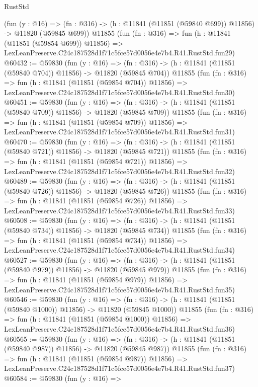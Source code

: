 \begin{lexlean}{RustStd}
\begin{coremodule}
    (fun (y : @16) =>
    (fn : @316) -> (h : @11841 (@11851 (@59840 @699)) @11856) -> @11820 (@59845 @699))
    @11855
    (fun (fn : @316) =>
    fun (h : @11841 (@11851 (@59854 @699)) @11856) =>
    LexLeanPreserve.C24c187528d1f71c5fce57d0056e4e7b4.R41.RustStd.fun29)
@60432 := @59830
    (fun (y : @16) =>
    (fn : @316) -> (h : @11841 (@11851 (@59840 @704)) @11856) -> @11820 (@59845 @704))
    @11855
    (fun (fn : @316) =>
    fun (h : @11841 (@11851 (@59854 @704)) @11856) =>
    LexLeanPreserve.C24c187528d1f71c5fce57d0056e4e7b4.R41.RustStd.fun30)
@60451 := @59830
    (fun (y : @16) =>
    (fn : @316) -> (h : @11841 (@11851 (@59840 @709)) @11856) -> @11820 (@59845 @709))
    @11855
    (fun (fn : @316) =>
    fun (h : @11841 (@11851 (@59854 @709)) @11856) =>
    LexLeanPreserve.C24c187528d1f71c5fce57d0056e4e7b4.R41.RustStd.fun31)
@60470 := @59830
    (fun (y : @16) =>
    (fn : @316) -> (h : @11841 (@11851 (@59840 @721)) @11856) -> @11820 (@59845 @721))
    @11855
    (fun (fn : @316) =>
    fun (h : @11841 (@11851 (@59854 @721)) @11856) =>
    LexLeanPreserve.C24c187528d1f71c5fce57d0056e4e7b4.R41.RustStd.fun32)
@60489 := @59830
    (fun (y : @16) =>
    (fn : @316) -> (h : @11841 (@11851 (@59840 @726)) @11856) -> @11820 (@59845 @726))
    @11855
    (fun (fn : @316) =>
    fun (h : @11841 (@11851 (@59854 @726)) @11856) =>
    LexLeanPreserve.C24c187528d1f71c5fce57d0056e4e7b4.R41.RustStd.fun33)
@60508 := @59830
    (fun (y : @16) =>
    (fn : @316) -> (h : @11841 (@11851 (@59840 @734)) @11856) -> @11820 (@59845 @734))
    @11855
    (fun (fn : @316) =>
    fun (h : @11841 (@11851 (@59854 @734)) @11856) =>
    LexLeanPreserve.C24c187528d1f71c5fce57d0056e4e7b4.R41.RustStd.fun34)
@60527 := @59830
    (fun (y : @16) =>
    (fn : @316) -> (h : @11841 (@11851 (@59840 @979)) @11856) -> @11820 (@59845 @979))
    @11855
    (fun (fn : @316) =>
    fun (h : @11841 (@11851 (@59854 @979)) @11856) =>
    LexLeanPreserve.C24c187528d1f71c5fce57d0056e4e7b4.R41.RustStd.fun35)
@60546 := @59830
    (fun (y : @16) =>
    (fn : @316) -> (h : @11841 (@11851 (@59840 @1000)) @11856) -> @11820 (@59845 @1000))
    @11855
    (fun (fn : @316) =>
    fun (h : @11841 (@11851 (@59854 @1000)) @11856) =>
    LexLeanPreserve.C24c187528d1f71c5fce57d0056e4e7b4.R41.RustStd.fun36)
@60565 := @59830
    (fun (y : @16) =>
    (fn : @316) -> (h : @11841 (@11851 (@59840 @987)) @11856) -> @11820 (@59845 @987))
    @11855
    (fun (fn : @316) =>
    fun (h : @11841 (@11851 (@59854 @987)) @11856) =>
    LexLeanPreserve.C24c187528d1f71c5fce57d0056e4e7b4.R41.RustStd.fun37)
@60584 := @59830
    (fun (y : @16) =>

\end{coremodule}
\end{lexlean}
